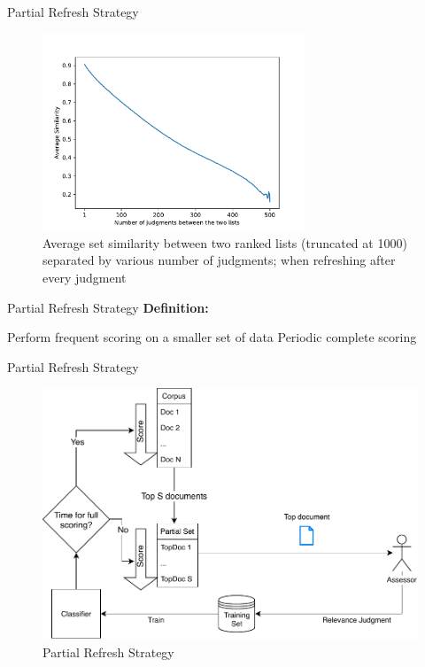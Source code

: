 \documentclass[14pt]{beamer}
\begin{document}
\begin{frame}{Partial Refresh Strategy}
\begin{figure}
 \centering 
 \includegraphics[width=0.7\textwidth]{../plots/ranklist_similarity.pdf}
 \caption{Average set similarity between two ranked lists (truncated at 1000)
 separated by various number of judgments; when refreshing after every judgment}
\end{figure}
\end{frame}

\begin{frame}{Partial Refresh Strategy}
\textbf{Definition:}

\vskip 0.7cm
Perform frequent scoring on a smaller set of data
\vskip 0.4cm
Periodic complete scoring
\end{frame}


\begin{frame}{Partial Refresh Strategy}
\begin{figure}
 \centering 
 \includegraphics[width=1.0\textwidth]{animation/partial.pdf}
 \caption{Partial Refresh Strategy}
\end{figure}
\end{frame}
\end{document}
